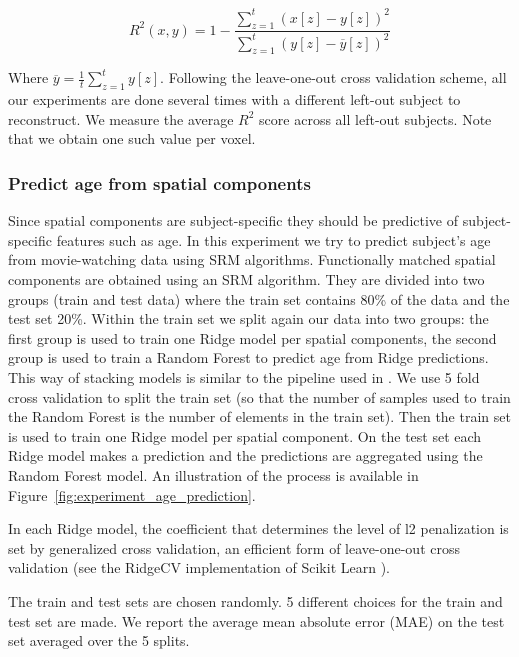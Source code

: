 \documentclass{report}
\begin{document}
{\[
	R^2(x, y) = 1 - \frac{\sum_{z=1}^t (x[z] - y[z])^2}{\sum_{z=1}^t (y[z] - \overline{y}[z])^2} 
\]

Where $\overline{y} = \frac{1}{t}\sum_{z=1}^t y[z]$.
%
Following the leave-one-out cross validation scheme, all our experiments are done several times with a different left-out subject to reconstruct. 
%
We measure the average $R^2$ score across  all left-out subjects. Note that we obtain one such value per voxel.

\subsubsection{Predict age from spatial components}
Since spatial components are subject-specific they should be predictive of subject-specific features such as age.
%
In this experiment we try to predict subject's age from movie-watching data using SRM algorithms.
%
Functionally matched spatial components are obtained using an SRM algorithm.
%
They are divided into two groups (train and test data) where the train set contains 80\% of the data and the test set 20\%.
%
Within the train set we split again our data into two groups: the first group is used to train one Ridge model per spatial components, the second group is used to train a Random Forest to predict age from Ridge predictions. This way of stacking models is similar to the pipeline used in \cite{rahim2017joint}.
%
We use 5 fold cross validation to split the train set (so that the number of samples used to train the Random Forest is the number of elements in the train set).
%
Then the train set is used to train one Ridge model per spatial component.
%
On the test set each Ridge model makes a prediction and the predictions are aggregated using the Random Forest model.
%
An illustration of the process is available in Figure~\ref{fig:experiment_age_prediction}. 

In each Ridge model, the coefficient that determines the level of l2 penalization is set by generalized cross validation, an efficient form of leave-one-out cross validation (see the RidgeCV implementation of Scikit Learn \cite{pedregosa2011scikit}).

The train and test sets are chosen randomly. 5 different choices for the train and test set are made. We report the average mean absolute error (MAE) on the test set averaged over the 5 splits.

}
\end{document}
